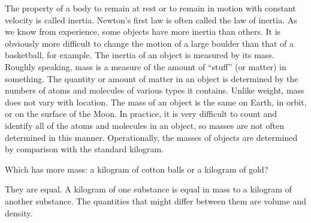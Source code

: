 \documentclass[../../main-ap-physics.tex]{subfiles}
\begin{document}
The property of a body to remain at rest or to remain in motion with constant velocity is called \gls{inertia}. Newton's first law is often called the \gls{law of inertia}. As we know from experience, some objects have more inertia than others. It is obviously more difficult to change the motion of a large boulder than that of a basketball, for example. The inertia of an object is measured by its mass. Roughly speaking, mass is a measure of the amount of ``stuff'' (or matter) in something. The quantity or amount of matter in an object is determined by the numbers of atoms and molecules of various types it contains. Unlike weight, mass does not vary with location. The mass of an object is the same on Earth, in orbit, or on the surface of the Moon. In practice, it is very difficult to count and identify all of the atoms and molecules in an object, so masses are not often determined in this manner. Operationally, the masses of objects are determined by comparison with the standard kilogram.

\begin{cfu}
    Which has more mass: a kilogram of cotton balls or a kilogram of gold?
\end{cfu}

\Solution They are equal. A kilogram of one substance is equal in mass to a kilogram of another substance. The quantities that might differ between them are volume and density.

\endsolution
\end{document}
